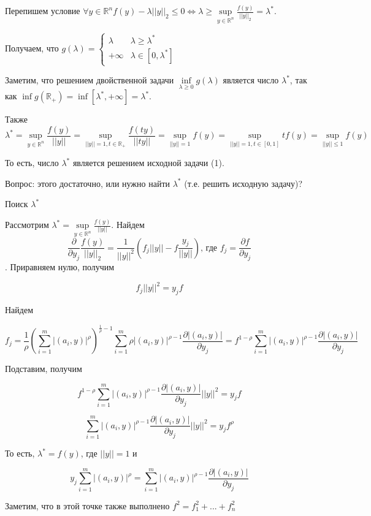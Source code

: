 \documentclass[a4paper]{article}
\begin{document}
Перепишем условие $\forall y\in\mathbb{R}^n f(y)-\lambda ||y||_2\leqslant 0\Leftrightarrow \lambda\geqslant \sup\limits_{y\in\mathbb{R}^n}\frac{f(y)}{||y||_2}=\lambda^*$.

Получаем, что $g(\lambda)=\begin{cases}
\lambda & \lambda\geqslant \lambda^*\\
+\infty & \lambda\in[0,\lambda^*]
\end{cases}$

Заметим, что решением двойственной задачи $\inf\limits_{\lambda\geqslant 0}g(\lambda)$ является число $\lambda^*$, так как $\inf g(\mathbb{R}_+)=\inf[\lambda^*,+\infty]=\lambda^*$.

Также
 $$\lambda^*=\sup\limits_{y\in\mathbb{R}^n}\frac{f(y)}{||y||}=\sup\limits_{||y||=1, t\in\mathbb{R}_+}\frac{f(ty)}{||ty||}=\sup\limits_{||y||=1}f(y)=\sup\limits_{||y||=1,t\in[0,1]}tf(y)=\sup\limits_{||y||\leqslant 1}f(y)$$

То есть, число $\lambda^*$ является решением исходной задачи (1).

Вопрос: этого достаточно, или нужно найти $\lambda^*$ (т.е. решить исходную задачу)?

Поиск $\lambda^*$

Рассмотрим $\lambda^*=\sup\limits_{y\in\mathbb{R}^n}\frac{f(y)}{||y||}$. Найдем $$\frac{\partial }{\partial y_j}\frac{f(y)}{||y||_2}=\frac{1}{||y||^2}(f_j||y||-f\frac{y_j}{||y||})\mbox{, где }f_j=\frac{\partial f}{\partial y_j}$$. Приравняем нулю, получим

$$f_j||y||^2=y_jf$$

Найдем

$$f_j=\frac{1}{\rho}\left(\sum\limits_{i=1}^m|(a_i,y)|^\rho\right)^{\frac{1}{\rho}-1}\sum\limits_{i=1}^m\rho |(a_i,y)|^{\rho-1}\frac{\partial |(a_i,y)|}{\partial y_j}=f^{1-\rho}\sum\limits_{i=1}^m|(a_i,y)|^{\rho-1}\frac{\partial |(a_i,y)|}{\partial y_j}$$

Подставим, получим

$$f^{1-\rho}\sum\limits_{i=1}^m|(a_i,y)|^{\rho-1}\frac{\partial |(a_i,y)|}{\partial y_j}||y||^2=y_jf$$

$$\sum\limits_{i=1}^m|(a_i,y)|^{\rho-1}\frac{\partial |(a_i,y)|}{\partial y_j}||y||^2=y_jf^\rho$$

То есть, $\lambda^*=f(y)$, где $||y||=1$ и

$$y_j\sum\limits_{i=1}^m|(a_i,y)|^\rho=\sum\limits_{i=1}^m|(a_i,y)|^{\rho-1}\frac{\partial |(a_i,y)|}{\partial y_j}$$

Заметим, что в этой точке также выполнено $f^2=f_1^2+...+f^2_n$
\end{document}
